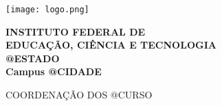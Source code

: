 \begin{minipage}{.19\textwidth}
    \texttt{[image: logo.png]}
\end{minipage}
\begin{minipage}[t]{\textwidth}
    \vspace{.001cm}
    {\bf
        {\selectfont
            INSTITUTO FEDERAL DE\\
            EDUCAÇÃO, CIÊNCIA E TECNOLOGIA\\
            {\color{green}
                \uppercase{@ESTADO}\\
                Campus @CIDADE
            }
        }
    }
\end{minipage}

{\bf {\selectfont
    \begin{center} {\selectfont
		COORDENAÇÃO DOS \uppercase{@CURSO}
    } \end{center}
} }
